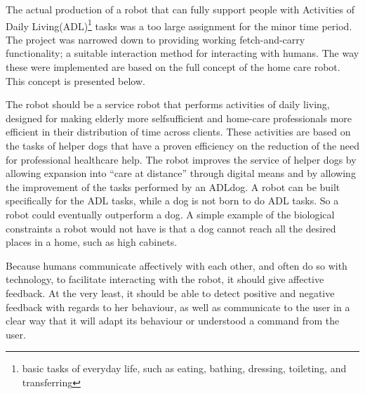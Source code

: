 \documentclass[project_eva.tex]{subfiles}
\begin{document}
The actual production of a robot that can fully support people with Activities of Daily Living(ADL)\footnote{basic tasks of everyday life, such as eating, bathing, dressing, toileting, and transferring}  tasks was a too large assignment for the minor time period. The project was narrowed down to providing working fetch-and-carry functionality; a suitable interaction method for interacting with humans. The way these were implemented are based on the full concept of the home care robot. This concept is presented below.

The robot should be a service robot that performs activities of daily living, designed for making elderly more selfsufficient\cite{Forlizzi} and home-care professionals more efficient in their distribution of time across clients. These 
activities are based on the tasks of helper dogs that have a proven efficiency on the reduction of the need for 
professional healthcare help\cite{Diepenhorst}. The robot improves the service of helper dogs by allowing 
expansion into ``care at distance'' \cite{Evers} through digital means and by allowing the improvement of the tasks 
performed by an ADLdog. A robot can be built specifically for the ADL tasks, while a dog is not born to do ADL tasks. So a robot could eventually outperform a dog.  A simple example of the biological constraints a robot would not have is that a dog cannot reach all the desired places in a home, such as high cabinets.

Because humans communicate affectively with each other, and often do so with technology, to facilitate interacting with the robot, it should give affective feedback. At the very least, it should be able to detect positive and negative feedback with regards to her behaviour, as well as communicate to the user in a clear way that it will adapt its behaviour or understood a command from the user.
\end{document}
